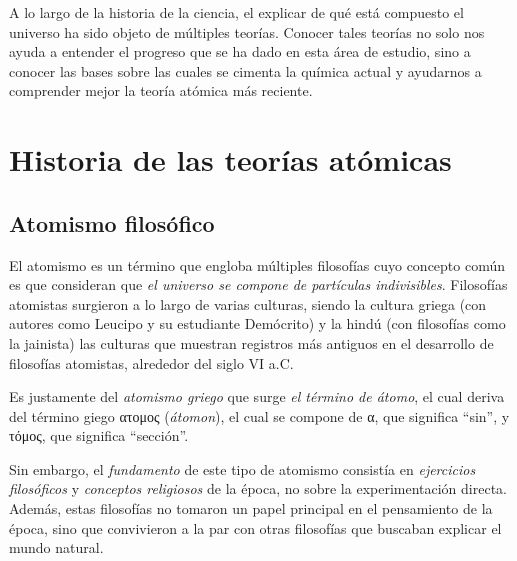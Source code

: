 

A lo largo de la historia de la ciencia, el explicar de qué está compuesto el universo ha sido objeto de múltiples teorías. Conocer tales teorías no solo nos ayuda a entender el progreso que se ha dado en esta área de estudio, sino a conocer las bases sobre las cuales se cimenta la química actual y ayudarnos a comprender mejor la teoría atómica más reciente.

\section{Historia de las teorías atómicas}

\subsection{Atomismo filosófico}

El atomismo es un término que engloba múltiples filosofías cuyo concepto común es que consideran que \emph{el universo se compone de partículas indivisibles}. Filosofías atomistas surgieron a lo largo de varias culturas, siendo la cultura griega (con autores como Leucipo y su estudiante Demócrito) y la hindú (con filosofías como la jainista) las culturas que muestran registros más antiguos en el desarrollo de filosofías atomistas, alrededor del siglo VI a.C.\citep{berrymanAncientAtomism2022}

Es justamente del \emph{atomismo griego} que surge \emph{el término de átomo}, el cual deriva del término giego ατομος (\textit{átomon}), el cual se compone de α, que significa ``sin'', y τόμος, que significa ``sección''.

Sin embargo, el \emph{fundamento} de este tipo de atomismo consistía en \emph{ejercicios filosóficos} y \emph{conceptos religiosos} de la época, no sobre la experimentación directa. Además, estas filosofías no tomaron un papel principal en el pensamiento de la época, sino que convivieron a la par con otras filosofías que buscaban explicar el mundo natural.

